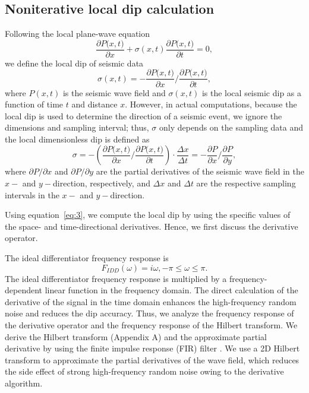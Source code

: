 \subsection{Noniterative local dip calculation}
Following the local plane-wave equation \cite[]{Fomel02}
\begin{equation}
  \label{eq:1}
  \frac{\partial{P(x,t})}{\partial{x}}+{\sigma}(x,t)
       \frac{\partial{P(x,t})}{\partial{t}}=0,
\end{equation}
we define the local dip of seismic data
\begin{equation}
  \label{eq:2}
  {\sigma}(x,t)=-\frac{\partial{P(x,t})}{\partial{x}}{\slash}
    \frac{\partial{P(x,t})}{\partial{t}},
\end{equation}
where $P(x,t)$ is the seismic wave field and ${\sigma}(x, t)$ is the
local seismic dip as a function of time $t$ and distance $x$.
However, in actual computations, because the local dip is used to
determine the direction of a seismic event, we ignore the dimensions
and sampling interval; thus, ${\sigma}$ only depends on the sampling
data and the local dimensionless dip is defined as
\begin{equation}
  \label{eq:3}
  {\sigma}=-(\frac{\partial{P(x,t})}{\partial{x}}{\slash}
    \frac{\partial{P(x,t})}{\partial{t}})\cdot
      \frac{{\Delta}x}{{\Delta}t}=
     -\frac{\partial{P}}{\partial{x}}{\slash}\frac{\partial{P}}{\partial{y}},
\end{equation}
where $\partial{P}{\slash}\partial{x}$ and
$\partial{P}{\slash}\partial{y}$ are the partial derivatives of the
seismic wave field in the $x-$ and $y-$direction, respectively, and
${\Delta}x$ and ${\Delta}t$ are the respective sampling intervals in
the $x-$ and $y-$direction.

Using equation~\ref{eq:3}, we compute the local dip by using the
specific values of the space- and time-directional derivatives. Hence,
we first discuss the derivative operator.

The ideal differentiator frequency response is
\begin{equation}
  \label{eq:4}
  F_{IDD}({\omega})=i{\omega},-{\pi}\leq\omega\leq\pi.
\end{equation}
The ideal differentiator frequency response is multiplied by a
frequency-dependent linear function in the frequency domain. The
direct calculation of the derivative of the signal in the time domain
enhances the high-frequency random noise and reduces the dip
accuracy. Thus, we analyze the frequency response of the derivative
operator and the frequency response of the Hilbert transform. We
derive the Hilbert transform (Appendix A) and the approximate partial
derivative by using the finite impulse response (FIR) filter
\cite[]{Pei01}.  We use a 2D Hilbert transform to approximate the
partial derivatives of the wave field, which reduces the side effect
of strong high-frequency random noise owing to the derivative
algorithm.

